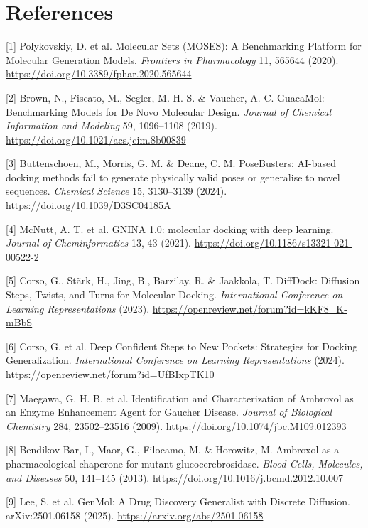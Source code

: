 \documentclass{article}
\begin{document}
\section*{References}

\small

[1] Polykovskiy, D. et al. Molecular Sets (MOSES): A Benchmarking Platform for Molecular Generation Models. \textit{Frontiers in Pharmacology} 11, 565644 (2020). \url{https://doi.org/10.3389/fphar.2020.565644}

[2] Brown, N., Fiscato, M., Segler, M. H. S. \& Vaucher, A. C. GuacaMol: Benchmarking Models for De Novo Molecular Design. \textit{Journal of Chemical Information and Modeling} 59, 1096--1108 (2019). \url{https://doi.org/10.1021/acs.jcim.8b00839}

[3] Buttenschoen, M., Morris, G. M. \& Deane, C. M. PoseBusters: AI-based docking methods fail to generate physically valid poses or generalise to novel sequences. \textit{Chemical Science} 15, 3130--3139 (2024). \url{https://doi.org/10.1039/D3SC04185A}

[4] McNutt, A. T. et al. GNINA 1.0: molecular docking with deep learning. \textit{Journal of Cheminformatics} 13, 43 (2021). \url{https://doi.org/10.1186/s13321-021-00522-2}

[5] Corso, G., St\"ark, H., Jing, B., Barzilay, R. \& Jaakkola, T. DiffDock: Diffusion Steps, Twists, and Turns for Molecular Docking. \textit{International Conference on Learning Representations} (2023). \url{https://openreview.net/forum?id=kKF8_K-mBbS}

[6] Corso, G. et al. Deep Confident Steps to New Pockets: Strategies for Docking Generalization. \textit{International Conference on Learning Representations} (2024). \url{https://openreview.net/forum?id=UfBIxpTK10}

[7] Maegawa, G. H. B. et al. Identification and Characterization of Ambroxol as an Enzyme Enhancement Agent for Gaucher Disease. \textit{Journal of Biological Chemistry} 284, 23502--23516 (2009). \url{https://doi.org/10.1074/jbc.M109.012393}

[8] Bendikov-Bar, I., Maor, G., Filocamo, M. \& Horowitz, M. Ambroxol as a pharmacological chaperone for mutant glucocerebrosidase. \textit{Blood Cells, Molecules, and Diseases} 50, 141--145 (2013). \url{https://doi.org/10.1016/j.bcmd.2012.10.007}

[9] Lee, S. et al. GenMol: A Drug Discovery Generalist with Discrete Diffusion. arXiv:2501.06158 (2025). \url{https://arxiv.org/abs/2501.06158}
\end{document}
